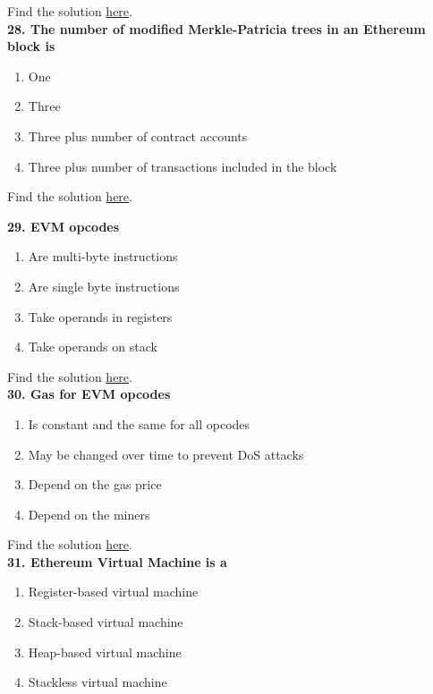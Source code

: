 Find the solution \hyperref[sec:exam1_q27]{here}.\\

\textbf{28. The number of modified Merkle-Patricia trees in an Ethereum block is}

\begin{enumerate}[label=\Alph*.]
    \item One
    \item Three
    \item Three plus number of contract accounts
    \item Three plus number of transactions included in the block
\end{enumerate}

Find the solution \hyperref[sec:exam1_q28]{here}.\\

\pagebreak

\textbf{29. EVM opcodes}

\begin{enumerate}[label=\Alph*.]
    \item Are multi-byte instructions
    \item Are single byte instructions
    \item Take operands in registers
    \item Take operands on stack
\end{enumerate}

Find the solution \hyperref[sec:exam1_q29]{here}.\\

\textbf{30. Gas for EVM opcodes}

\begin{enumerate}[label=\Alph*.]
    \item Is constant and the same for all opcodes
    \item May be changed over time to prevent DoS attacks
    \item Depend on the gas price
    \item Depend on the miners
\end{enumerate}

Find the solution \hyperref[sec:exam1_q30]{here}.\\

\textbf{31. Ethereum Virtual Machine is a}

\begin{enumerate}[label=\Alph*.]
    \item Register-based virtual machine
    \item Stack-based virtual machine
    \item Heap-based virtual machine
    \item Stackless virtual machine
\end{enumerate}

